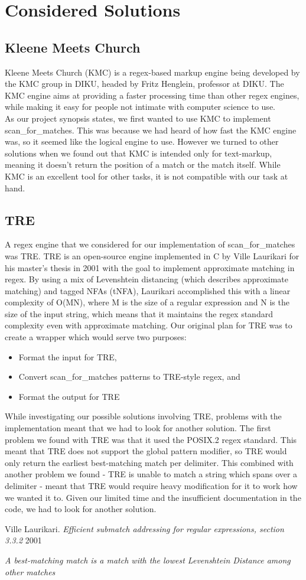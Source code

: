 \documentclass[11pt,twoside,a4paper]{article}
\begin{document}
\section{Considered Solutions}
\subsection{Kleene Meets Church}
Kleene Meets Church (KMC) is a regex-based markup engine being developed by 
the KMC group in DIKU, headed by Fritz Henglein, professor at DIKU. The KMC 
engine aims at providing a faster processing time than other regex engines, 
while making it easy for people not intimate with computer science to use.\\
As our project synopsis states, we first wanted to use KMC to implement 
scan\_for\_matches. This was because we had heard of 
how fast the KMC engine was, so it seemed like the logical engine to use. 
However we turned to other solutions when we found out that 
KMC is intended only for text-markup, meaning it doesn't return the position 
of a match or the match itself. While KMC is an excellent tool for other tasks, it 
is not compatible with our task at hand.

\subsection{TRE}
A regex engine that we considered for our implementation of scan\_for\_matches 
was TRE. TRE is an open-source engine implemented in C by Ville Laurikari for 
his master's thesis in 2001 with the goal to implement approximate matching in 
regex. By using a mix of Levenshtein distancing (which describes 
approximate matching) and tagged NFAs (tNFA), Laurikari accomplished this with a 
linear complexity of O(MN), where M is the size of a regular expression and N is the 
size of the input string\cite{LaurikariComplex}, which means that it maintains the 
regex standard complexity even with approximate matching. Our original plan 
for TRE was to create a wrapper which would serve two purposes:
\begin{itemize}
\item Format the input for TRE, 
\item Convert scan\_for\_matches patterns to TRE-style regex, and
\item Format the output for TRE
\end{itemize}
While investigating our possible solutions involving TRE, problems 
with the implementation meant that we 
had to look for another solution. The first problem we found with TRE was that 
it used the POSIX.2 regex standard. This meant that TRE does not support the 
global pattern modifier, so TRE would only return the earliest best-matching 
match per delimiter\cite{Best-Match}. This combined with another problem we found 
- TRE is unable to match a string which spans over a delimiter - meant that 
TRE would require heavy modification for it to work how we wanted it to. Given our 
limited time and the insufficient documentation in the code, we had to look for another solution.

\begin{thebibliography}{9}
Ville Laurikari.
\textit{Efficient submatch addressing for regular expressions, section 3.3.2}
2001

\textit{A best-matching match is a match with the lowest Levenshtein Distance among other matches}

\end{thebibliography}
\end{document}
